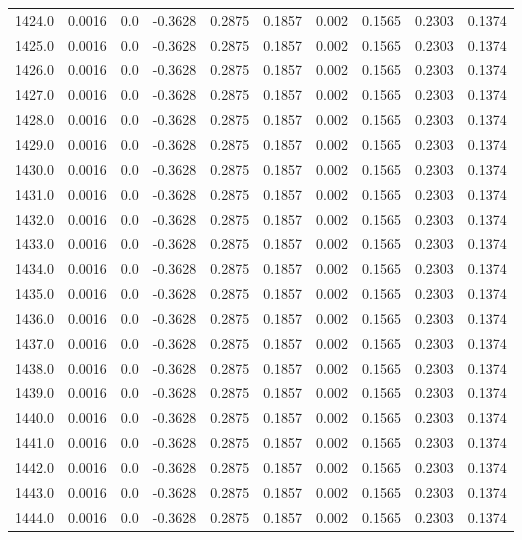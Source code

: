 \begin{longtable}{lrrrrrrrrr}
1424.0 & 0.0016 & 0.0 & -0.3628 & 0.2875 & 0.1857 & 0.002 & 0.1565 & 0.2303 & 0.1374 \\
1425.0 & 0.0016 & 0.0 & -0.3628 & 0.2875 & 0.1857 & 0.002 & 0.1565 & 0.2303 & 0.1374 \\
1426.0 & 0.0016 & 0.0 & -0.3628 & 0.2875 & 0.1857 & 0.002 & 0.1565 & 0.2303 & 0.1374 \\
1427.0 & 0.0016 & 0.0 & -0.3628 & 0.2875 & 0.1857 & 0.002 & 0.1565 & 0.2303 & 0.1374 \\
1428.0 & 0.0016 & 0.0 & -0.3628 & 0.2875 & 0.1857 & 0.002 & 0.1565 & 0.2303 & 0.1374 \\
1429.0 & 0.0016 & 0.0 & -0.3628 & 0.2875 & 0.1857 & 0.002 & 0.1565 & 0.2303 & 0.1374 \\
1430.0 & 0.0016 & 0.0 & -0.3628 & 0.2875 & 0.1857 & 0.002 & 0.1565 & 0.2303 & 0.1374 \\
1431.0 & 0.0016 & 0.0 & -0.3628 & 0.2875 & 0.1857 & 0.002 & 0.1565 & 0.2303 & 0.1374 \\
1432.0 & 0.0016 & 0.0 & -0.3628 & 0.2875 & 0.1857 & 0.002 & 0.1565 & 0.2303 & 0.1374 \\
1433.0 & 0.0016 & 0.0 & -0.3628 & 0.2875 & 0.1857 & 0.002 & 0.1565 & 0.2303 & 0.1374 \\
1434.0 & 0.0016 & 0.0 & -0.3628 & 0.2875 & 0.1857 & 0.002 & 0.1565 & 0.2303 & 0.1374 \\
1435.0 & 0.0016 & 0.0 & -0.3628 & 0.2875 & 0.1857 & 0.002 & 0.1565 & 0.2303 & 0.1374 \\
1436.0 & 0.0016 & 0.0 & -0.3628 & 0.2875 & 0.1857 & 0.002 & 0.1565 & 0.2303 & 0.1374 \\
1437.0 & 0.0016 & 0.0 & -0.3628 & 0.2875 & 0.1857 & 0.002 & 0.1565 & 0.2303 & 0.1374 \\
1438.0 & 0.0016 & 0.0 & -0.3628 & 0.2875 & 0.1857 & 0.002 & 0.1565 & 0.2303 & 0.1374 \\
1439.0 & 0.0016 & 0.0 & -0.3628 & 0.2875 & 0.1857 & 0.002 & 0.1565 & 0.2303 & 0.1374 \\
1440.0 & 0.0016 & 0.0 & -0.3628 & 0.2875 & 0.1857 & 0.002 & 0.1565 & 0.2303 & 0.1374 \\
1441.0 & 0.0016 & 0.0 & -0.3628 & 0.2875 & 0.1857 & 0.002 & 0.1565 & 0.2303 & 0.1374 \\
1442.0 & 0.0016 & 0.0 & -0.3628 & 0.2875 & 0.1857 & 0.002 & 0.1565 & 0.2303 & 0.1374 \\
1443.0 & 0.0016 & 0.0 & -0.3628 & 0.2875 & 0.1857 & 0.002 & 0.1565 & 0.2303 & 0.1374 \\
1444.0 & 0.0016 & 0.0 & -0.3628 & 0.2875 & 0.1857 & 0.002 & 0.1565 & 0.2303 & 0.1374 \\

\end{longtable}

